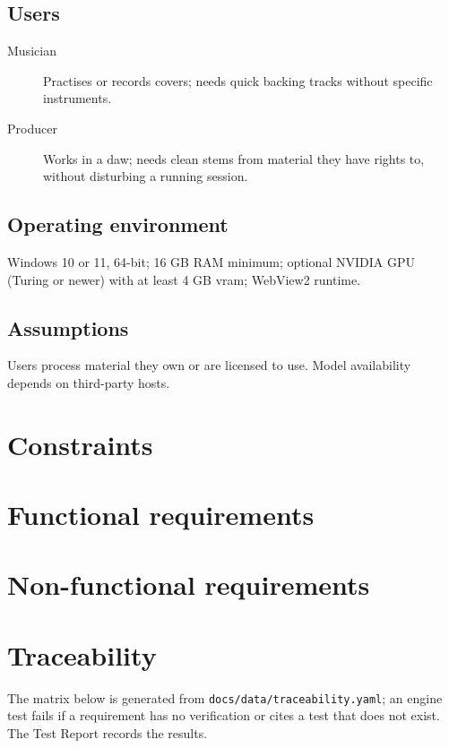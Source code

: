 \documentclass{covermaker}
\begin{document}
\section{Users}
\begin{description}
  \item[Musician] Practises or records covers; needs quick backing tracks
        without specific instruments.
  \item[Producer] Works in a \gls{daw}; needs clean stems from material they
        have rights to, without disturbing a running session.
\end{description}

\section{Operating environment}
Windows 10 or 11, 64-bit; 16 GB RAM minimum; optional NVIDIA GPU (Turing or
newer) with at least 4 GB \gls{vram}; WebView2 runtime.

\section{Assumptions}
Users process material they own or are licensed to use. Model availability
depends on third-party hosts.

\chapter{Constraints}


\chapter{Functional requirements}


\chapter{Non-functional requirements}


\chapter{Traceability}
The matrix below is generated from \texttt{docs/data/traceability.yaml}; an
engine test fails if a requirement has no verification or cites a test that
does not exist. The Test Report records the results.

{\small

}

\printnoidxglossaries
\end{document}

